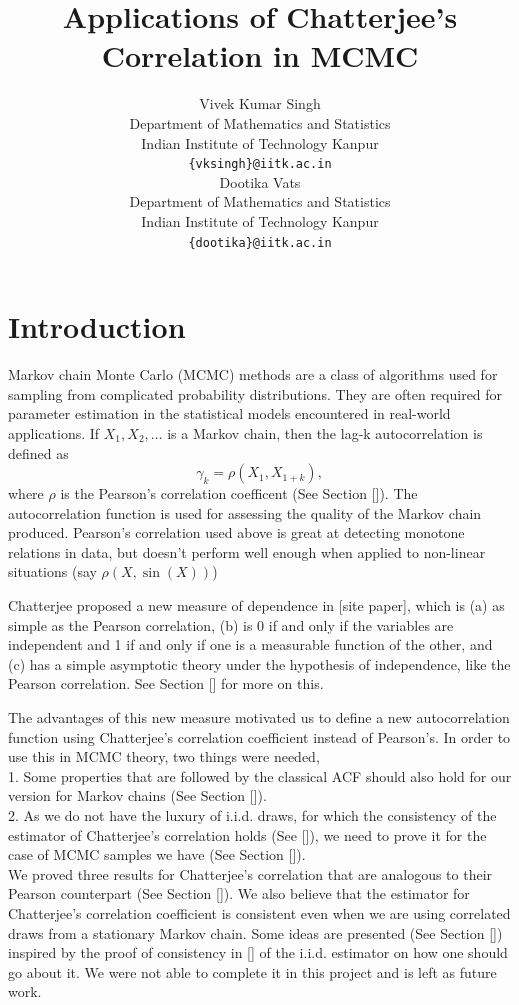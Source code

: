 \documentclass{article}
\title{Applications of Chatterjee's Correlation in MCMC
}
\author{
  Vivek Kumar Singh \\
  Department of Mathematics and Statistics \\
  Indian Institute of Technology Kanpur \\
  \texttt{\{vksingh\}@iitk.ac.in} \\
   \And
  Dootika Vats \\
  Department of Mathematics and Statistics \\
  Indian Institute of Technology Kanpur \\
 \texttt{\{dootika\}@iitk.ac.in}
}
\begin{document}
\maketitle

\section{Introduction}

	Markov chain Monte Carlo (MCMC) methods are a class of algorithms used for sampling from complicated probability distributions.
	They are often required for parameter estimation in the statistical models encountered in real-world applications.
	If $X_1, X_2, \dots$ is a Markov chain,
	then the lag-k autocorrelation is defined as
	$$\gamma_k = \rho(X_1, X_{1+k}),$$
	where $\rho$ is the Pearson's correlation coefficent (See Section []).
	The autocorrelation function is used for assessing the quality of the Markov chain produced.
	Pearson's correlation used above is great at detecting monotone relations in data,
	but doesn't perform well enough when applied to non-linear situations (say $\rho(X, \sin(X))$)

	Chatterjee proposed a new measure of dependence in [site paper], which is
	(a) as simple as the Pearson correlation,
	(b) is 0 if and only if the variables are independent and 1 if and only if one is a measurable function of the other, and
	(c) has a simple asymptotic theory under the hypothesis of independence, like the Pearson correlation.
	See Section [] for more on this.

	The advantages of this new measure motivated us to define a new autocorrelation function using Chatterjee's correlation coefficient instead of Pearson's.
	In order to use this in MCMC theory, two things were needed,\\
	1. Some properties that are followed by the classical ACF should also hold for our version for Markov chains (See Section []).\\
	2. As we do not have the luxury of i.i.d. draws, for which the consistency of the estimator of Chatterjee's correlation holds (See []),
		we need to prove it for the case of MCMC samples we have (See Section []).\\
	We proved three results for Chatterjee's correlation that are analogous to their Pearson counterpart (See Section []).
	We also believe that the estimator for Chatterjee's correlation coefficient is consistent even when we are using correlated draws from a stationary Markov chain.
	Some ideas are presented (See Section []) inspired by the proof of consistency in [] of the i.i.d. estimator on how one should go about it.
	We were not able to complete it in this project and is left as future work.
\end{document}
